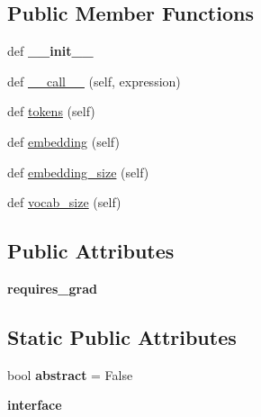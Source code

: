 \subsection*{Public Member Functions}
\begin{DoxyCompactItemize}
\item 
def {\bfseries \+\_\+\+\_\+init\+\_\+\+\_\+}\hypertarget{classreader_1_1Vocabulary_afb0b5a10ff051596a4ddd114d8beeb89}{}\label{classreader_1_1Vocabulary_afb0b5a10ff051596a4ddd114d8beeb89}

\item 
def \hyperlink{classreader_1_1Vocabulary_a2275ec176790e326220d214a22242960}{\+\_\+\+\_\+call\+\_\+\+\_\+} (self, expression)
\item 
def \hyperlink{classreader_1_1Vocabulary_ae9404abdf41f1c65a20a28555ab5d645}{tokens} (self)
\item 
def \hyperlink{classreader_1_1Vocabulary_a164806110f73c38de9632f3e6e80cd7d}{embedding} (self)
\item 
def \hyperlink{classreader_1_1Vocabulary_ac2cc36e1c088799bee36b358735a59e4}{embedding\+\_\+size} (self)
\item 
def \hyperlink{classreader_1_1Vocabulary_a702c6858c252e972c8cd05cee425055d}{vocab\+\_\+size} (self)
\end{DoxyCompactItemize}
\subsection*{Public Attributes}
\begin{DoxyCompactItemize}
\item 
{\bfseries requires\+\_\+grad}\hypertarget{classreader_1_1Vocabulary_a42fe15a48b15b753a632b6450faf660b}{}\label{classreader_1_1Vocabulary_a42fe15a48b15b753a632b6450faf660b}

\end{DoxyCompactItemize}
\subsection*{Static Public Attributes}
\begin{DoxyCompactItemize}
\item 
bool {\bfseries abstract} = False\hypertarget{classreader_1_1Vocabulary_ad9c2ea88308b5498a97b5e778939ed65}{}\label{classreader_1_1Vocabulary_ad9c2ea88308b5498a97b5e778939ed65}

\item 
{\bfseries interface}
\end{DoxyCompactItemize}


